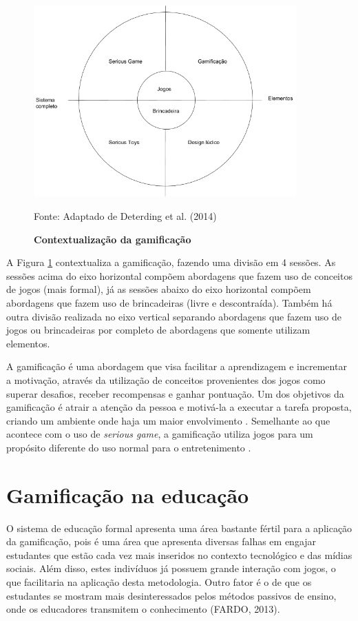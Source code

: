 \documentclass[
	12pt,				%
	oneside,			%
	a4paper,			%
	english,			%
	french,				%
	spanish,			%
	brazil,				%
	]{abntex2}
\begin{document}
\begin{figure}[ht]
\centering
\caption{\textbf{Contextualização da gamificação }}
\includegraphics[width=0.9\textwidth]{imagens/gamificacao.png}

Fonte: Adaptado de Deterding et al. (2014)
\label{fig:gamificacao}
\end{figure}

A Figura \ref{fig:gamificacao} contextualiza a gamificação, fazendo uma divisão em 4 sessões. As sessões acima do eixo horizontal compõem abordagens que fazem uso de conceitos de jogos (mais formal), já as sessões abaixo do eixo horizontal compõem abordagens que fazem uso de brincadeiras (livre e descontraída). Também há outra divisão realizada no eixo vertical separando abordagens que fazem uso de jogos ou brincadeiras por completo de abordagens que somente utilizam elementos.

A gamificação é uma abordagem que visa facilitar a aprendizagem e incrementar a motivação, através da utilização de conceitos provenientes dos jogos como superar desafios, receber recompensas e ganhar pontuação. Um dos objetivos da gamificação é atrair a atenção da pessoa e motivá-la a executar a tarefa proposta, criando um ambiente onde haja um maior envolvimento \cite{kaap:2014}. Semelhante ao que acontece com o uso de \textit{serious game}, a gamificação utiliza jogos para um propósito diferente do uso normal para o entretenimento \cite{deterding2011game}.

\section{Gamificação na educação}

O sistema de educação formal apresenta uma área bastante fértil para a aplicação da gamificação, pois é uma área que apresenta diversas falhas em engajar estudantes que estão cada vez mais inseridos no contexto tecnológico e das mídias sociais. Além disso, estes indivíduos já possuem grande interação com jogos, o que facilitaria na aplicação desta metodologia. Outro fator é o de que os estudantes se mostram mais desinteressados pelos métodos passivos de ensino, onde os educadores transmitem o conhecimento (FARDO, 2013). 
\end{document}
